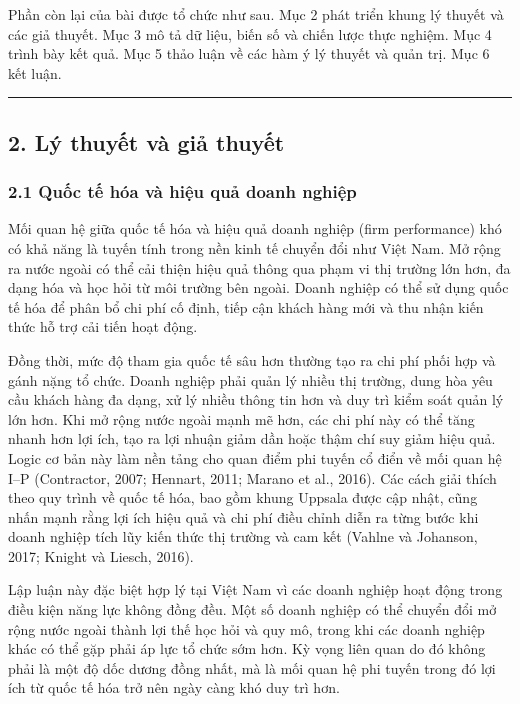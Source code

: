 \documentclass[12pt,a4paper]{article}
\begin{document}
Phần còn lại của bài được tổ chức như sau. Mục 2 phát triển khung lý
thuyết và các giả thuyết. Mục 3 mô tả dữ liệu, biến số và chiến lược
thực nghiệm. Mục 4 trình bày kết quả. Mục 5 thảo luận về các hàm ý lý
thuyết và quản trị. Mục 6 kết luận.

\begin{center}\rule{0.5\linewidth}{0.5pt}\end{center}

\hypertarget{2-luxfd-thuyux1ebft-vuxe0-giux1ea3-thuyux1ebft}{%
\subsection{2. Lý thuyết và giả
thuyết}\label{2-luxfd-thuyux1ebft-vuxe0-giux1ea3-thuyux1ebft}}

\hypertarget{21-quux1ed1c-tux1ebf-huxf3a-vuxe0-hiux1ec7u-quux1ea3-doanh-nghiux1ec7p}{%
\subsubsection{2.1 Quốc tế hóa và hiệu quả doanh
nghiệp}\label{21-quux1ed1c-tux1ebf-huxf3a-vuxe0-hiux1ec7u-quux1ea3-doanh-nghiux1ec7p}}

Mối quan hệ giữa quốc tế hóa và hiệu quả doanh nghiệp (firm performance)
khó có khả năng là tuyến tính trong nền kinh tế chuyển đổi như Việt Nam.
Mở rộng ra nước ngoài có thể cải thiện hiệu quả thông qua phạm vi thị
trường lớn hơn, đa dạng hóa và học hỏi từ môi trường bên ngoài. Doanh
nghiệp có thể sử dụng quốc tế hóa để phân bổ chi phí cố định, tiếp cận
khách hàng mới và thu nhận kiến thức hỗ trợ cải tiến hoạt động.

Đồng thời, mức độ tham gia quốc tế sâu hơn thường tạo ra chi phí phối
hợp và gánh nặng tổ chức. Doanh nghiệp phải quản lý nhiều thị trường,
dung hòa yêu cầu khách hàng đa dạng, xử lý nhiều thông tin hơn và duy
trì kiểm soát quản lý lớn hơn. Khi mở rộng nước ngoài mạnh mẽ hơn, các
chi phí này có thể tăng nhanh hơn lợi ích, tạo ra lợi nhuận giảm dần
hoặc thậm chí suy giảm hiệu quả. Logic cơ bản này làm nền tảng cho quan
điểm phi tuyến cổ điển về mối quan hệ I--P (Contractor, 2007; Hennart,
2011; Marano et al., 2016). Các cách giải thích theo quy trình về quốc
tế hóa, bao gồm khung Uppsala được cập nhật, cũng nhấn mạnh rằng lợi ích
hiệu quả và chi phí điều chỉnh diễn ra từng bước khi doanh nghiệp tích
lũy kiến thức thị trường và cam kết (Vahlne và Johanson, 2017; Knight và
Liesch, 2016).

Lập luận này đặc biệt hợp lý tại Việt Nam vì các doanh nghiệp hoạt động
trong điều kiện năng lực không đồng đều. Một số doanh nghiệp có thể
chuyển đổi mở rộng nước ngoài thành lợi thế học hỏi và quy mô, trong khi
các doanh nghiệp khác có thể gặp phải áp lực tổ chức sớm hơn. Kỳ vọng
liên quan do đó không phải là một độ dốc dương đồng nhất, mà là mối quan
hệ phi tuyến trong đó lợi ích từ quốc tế hóa trở nên ngày càng khó duy
trì hơn.
\end{document}
